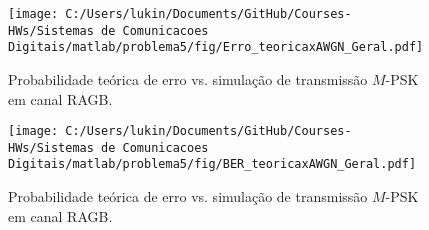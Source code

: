 \begin{figure}[!ht]
    \centering
    \texttt{[image: C:/Users/lukin/Documents/GitHub/Courses-HWs/Sistemas de Comunicacoes Digitais/matlab/problema5/fig/Erro\_teoricaxAWGN\_Geral.pdf]}
    \caption{Probabilidade teórica de erro vs. simulação de transmissão $M$-PSK em canal RAGB.}
    \label{fig:Erro_teoricaxAWGN_Geral}
\end{figure}

\begin{figure}[!ht]
    \centering
    \texttt{[image: C:/Users/lukin/Documents/GitHub/Courses-HWs/Sistemas de Comunicacoes Digitais/matlab/problema5/fig/BER\_teoricaxAWGN\_Geral.pdf]}
    \caption{Probabilidade teórica de erro vs. simulação de transmissão $M$-PSK em canal RAGB.}
    \label{fig:BER_teoricaxAWGN_Geral}
\end{figure}

